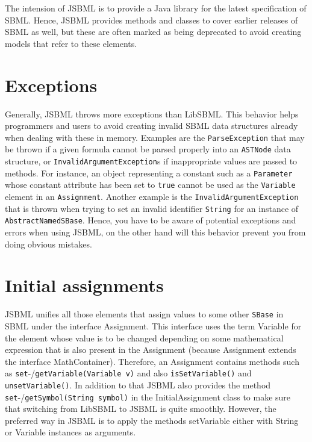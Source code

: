 \documentclass[
  letterpaper,
  11pt,
  headsepline,
  pointlessnumbers,
  tablecaptionabove,
  headinclude,
  appendixprefix,
  idxtotoc,
  bibtotoc
]{scrartcl}
\begin{document}
The intension of JSBML is to provide a Java library for the latest 
specification of SBML. Hence, JSBML provides methods and classes to
cover earlier releases of SBML as well, but these are often marked
as being deprecated to avoid creating models that refer to these 
elements.

\section{Exceptions}

Generally, JSBML throws more exceptions than LibSBML. This behavior helps
programmers and users to avoid creating invalid SBML data structures already
when dealing with these in memory. Examples are the \verb!ParseException! that
may be thrown if a given formula cannot be parsed properly into an \verb!ASTNode!
data structure, or \verb!InvalidArgumentException!s if inappropriate values are
passed to methods. For instance, an object representing a constant such as a
\verb!Parameter! whose constant attribute has been set to \verb!true! cannot be
used as the \verb!Variable! element in an \verb!Assignment!. Another example is
the \verb!InvalidArgumentException! that is thrown when trying to set an invalid
identifier \verb!String! for an instance of \verb!AbstractNamedSBase!. Hence,
you have to be aware of potential exceptions and errors when using JSBML, on the
other hand will this behavior prevent you from doing obvious mistakes.


\section{Initial assignments}

JSBML unifies all those elements that assign values to some other 
\verb!SBase! in SBML under the interface Assignment. This interface uses
the term Variable for the element whose value is to be changed depending
on some mathematical expression that is also present in the Assignment
(because Assignment extends the interface MathContainer). Therefore,
an Assignment contains methods such as \verb!set!-/\verb!getVariable(Variable v)!
and also \verb!isSetVariable()! and \verb!unsetVariable()!. In addition to that
JSBML also provides the method \verb!set!-/\verb!getSymbol(String symbol)! in the
InitialAssignment class to make sure that switching from LibSBML to
JSBML is quite smoothly. However, the preferred way in JSBML is to
apply the methods setVariable either with String or Variable instances
as arguments.
\end{document}
